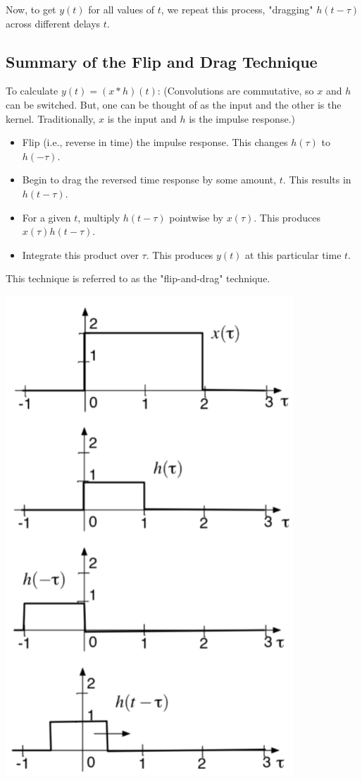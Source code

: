 \documentclass[10pt]{article}
\begin{document}
Now, to get $y(t)$ for all values of $t$, we repeat this process, "dragging" $h(t - \tau)$ across different delays $t$.

\subsection*{Summary of the Flip and Drag Technique}
To calculate $y(t) = (x * h)(t)$:
(Convolutions are commutative, so $x$ and $h$ can be switched.  But, one can be thought of as the input and the other is the kernel.  Traditionally, $x$ is the input and $h$ is the impulse response.)
\begin{itemize}
    \item Flip (i.e., reverse in time) the impulse response.  This changes $h(\tau)$ to $h(-\tau)$.
    \item Begin to drag the reversed time response by some amount, $t$.  This results in $h(t - \tau)$.
    \item For a given $t$, multiply $h(t - \tau)$ pointwise by $x(\tau)$.  This produces $x(\tau) h(t - \tau)$.
    \item Integrate this product over $\tau$.  This produces $y(t)$ at this particular time $t$.
\end{itemize}
This technique is referred to as the "flip-and-drag" technique.
\begin{center}
    \includegraphics[scale=0.6]{W3_7.png}\\
\end{center}
\end{document}

